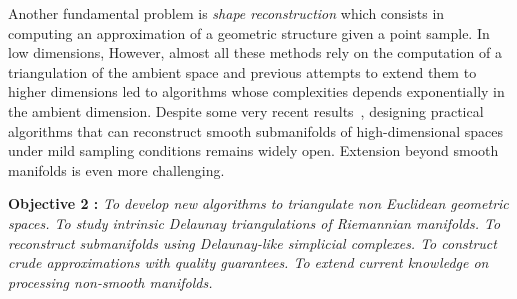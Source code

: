 Another fundamental problem is {\em shape reconstruction} which consists in computing an approximation of a geometric structure given a point sample.  In low dimensions, %
However,   almost all these methods rely on the computation of a triangulation of the ambient space and previous attempts to extend them to higher dimensions led to algorithms whose complexities depends exponentially in the ambient dimension.  Despite some very recent results~\cite{geometrica-7142i}, designing practical algorithms that can reconstruct smooth submanifolds of high-dimensional spaces under mild sampling conditions remains widely open. Extension beyond smooth manifolds is even more challenging.


\vspace{2mm}

{\bf Objective 2 :}  {\em To   develop new algorithms to {\em  triangulate non Euclidean geometric spaces}. To study intrinsic Delaunay triangulations of Riemannian manifolds.  To reconstruct submanifolds using Delaunay-like simplicial complexes. To construct crude approximations 
with quality guarantees. To extend current knowledge on processing non-smooth manifolds. }

